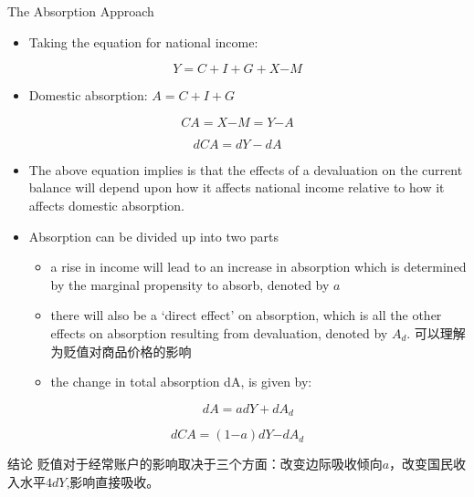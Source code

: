 \documentclass[10pt,hyperref={CJKbookmarks=true},xcolor=dvipsnames,aspectratio=169]{beamer}
\begin{document}
\begin{frame}[allowframebreaks]{The Absorption Approach}

\begin{itemize}
\item Taking the equation for national income:
\end{itemize}

\[
Y=C+I+G+X\text{−}M
\]

\begin{itemize}
\item Domestic absorption: $A=C+I+G$
\end{itemize}

\[
CA=X\text{−}M=Y\text{−}A
\]


\[
dCA=dY-dA
\]

\begin{itemize}
\item The above equation implies is that the effects of a devaluation on
the current balance will depend upon how it affects national income
relative to how it affects domestic absorption. 
\item Absorption can be divided up into two parts

\begin{itemize}
\item a rise in income will lead to an increase in absorption which is determined
by the marginal propensity to absorb, denoted by $a$
\item there will also be a ‘direct effect’ on absorption, which is all the
other effects on absorption resulting from devaluation, denoted by
$A_{d}$. 可以理解为贬值对商品价格的影响
\item the change in total absorption dA, is given by:
\end{itemize}

\[
dA=adY+dA_{d}
\]


\end{itemize}

\[
dCA=(1\text{−}a)dY\text{−}dA_{d}
\]

\begin{block}{结论}
	贬值对于经常账户的影响取决于三个方面：改变边际吸收倾向$a$，改变国民收入水平$4dY$,影响直接吸收。
\end{block}



\end{frame}
\end{document}
